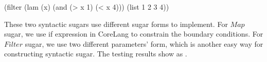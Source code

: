 \begin{Codes}
    (filter (lam (x) (and (> x 1) (< x 4))) (list 1 2 3 4))
\end{Codes}

These two syntactic sugars use different sugar forms to implement. For $Map$ sugar, we use if expression in CoreLang to constrain the boundary conditions. For $Filter$ sugar, we use two different parameters' form, which is another easy way for constructing syntactic sugar. The testing results show as .


	
					
